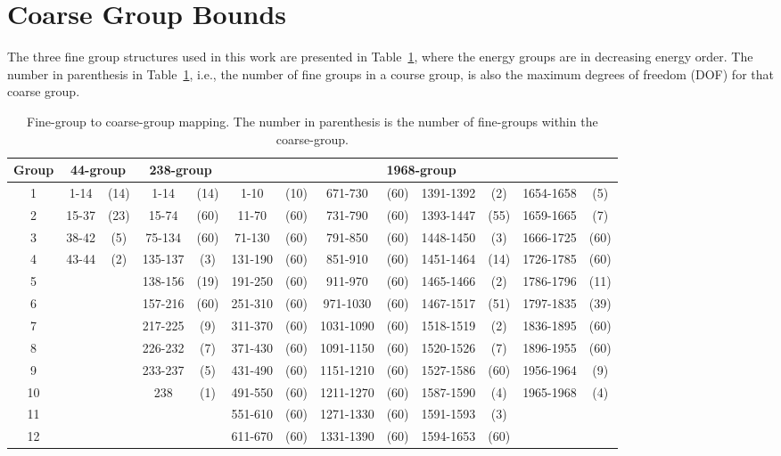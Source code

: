 \documentclass[5p,times,twocolumn,10pt]{elsarticle}
\newcommand{\TAB}[1]{Table~\ref{#1}}              %
\begin{document}
    \section{Coarse Group Bounds}
    The three fine group structures used in this work are presented in \TAB{tab:cg_struct}, where the energy groups are in decreasing energy order.
    The number in parenthesis in \TAB{tab:cg_struct}, i.e., the number of fine groups in a course group, is also the maximum degrees of freedom (DOF) for that coarse group.
    \begin{table}[htb]
        \centering
        \caption{Fine-group to coarse-group mapping.  The number in parenthesis is the number of fine-groups within the coarse-group.}
        \begin{tabular}{c|cc|cc|cccccccc}\toprule
            Group & \multicolumn{2}{|c|}{44-group} & \multicolumn{2}{|c|}{238-group}
            & \multicolumn{8}{c}{1968-group}
            \\ \midrule
            1 &1-14 &(14)&1-14   &(14)&1-10   &(10)&671-730  &(60)&1391-1392&(2) &1654-1658&(5)\\
            2 &15-37&(23)&15-74  &(60)&11-70  &(60)&731-790  &(60)&1393-1447&(55)&1659-1665&(7)\\
            3 &38-42&(5) &75-134 &(60)&71-130 &(60)&791-850  &(60)&1448-1450&(3) &1666-1725&(60)\\
            4 &43-44&(2) &135-137&(3) &131-190&(60)&851-910  &(60)&1451-1464&(14)&1726-1785&(60)\\
            5 &     &    &138-156&(19)&191-250&(60)&911-970  &(60)&1465-1466&(2) &1786-1796&(11)\\
            6 &     &    &157-216&(60)&251-310&(60)&971-1030 &(60)&1467-1517&(51)&1797-1835&(39)\\
            7 &     &    &217-225&(9) &311-370&(60)&1031-1090&(60)&1518-1519&(2) &1836-1895&(60)\\
            8 &     &    &226-232&(7) &371-430&(60)&1091-1150&(60)&1520-1526&(7) &1896-1955&(60)\\
            9 &     &    &233-237&(5) &431-490&(60)&1151-1210&(60)&1527-1586&(60)&1956-1964&(9)\\
            10&     &    &238    &(1) &491-550&(60)&1211-1270&(60)&1587-1590&(4) &1965-1968&(4)\\
            11&     &    &       &    &551-610&(60)&1271-1330&(60)&1591-1593&(3) &         &\\
            12&     &    &       &    &611-670&(60)&1331-1390&(60)&1594-1653&(60)&         &\\
            \bottomrule
        \end{tabular}

        \label{tab:cg_struct}
    \end{table}
\end{document}

